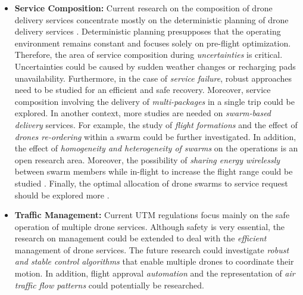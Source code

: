 \documentclass[conference]{IEEEtran}
\begin{document}
\begin{itemize}
    \item \textbf{Service Composition:}
   Current research on the composition of drone delivery services concentrate mostly on the deterministic planning of drone delivery services \cite{shahzaad2019composing}. Deterministic planning presupposes that the operating environment remains constant and focuses solely on pre-flight optimization. Therefore, the area of service composition during \textit{uncertainties} is critical. Uncertainties could be caused by sudden weather changes or recharging pads unavailability. Furthermore, in the case of \textit{service failure}, robust approaches need to be studied for an efficient and safe recovery. Moreover, service composition involving the delivery of\textit{ multi-packages} in a single trip could be explored. In another context, more studies are needed on \textit{swarm-based delivery} services. For example, the study of \textit{flight formations} and the effect of \textit{drones re-ordering} within a swarm could be further investigated. In addition, the effect of \textit{homogeneity and heterogeneity of swarms} on the operations is an open research area. Moreover, the possibility of \textit{sharing energy wirelessly} between swarm members while in-flight to increase the flight range could be studied \cite{lakhdari2020crowdsharing}. Finally, the optimal allocation of drone swarms to service request should be explored more \cite{alkouz2021reinforcemnt}. 
   


    
    \item \textbf{Traffic Management:}
    Current UTM regulations focus mainly on the safe operation of multiple drone services. Although safety is very essential, the research on management could be extended to deal with the \textit{efficient} management of drone services. The future research could investigate \textit{robust and stable control algorithms} that enable multiple drones to coordinate their motion. In addition, flight approval \textit{automation} and the representation of \textit{air traffic flow patterns} could potentially be researched. 


\end{itemize}
\end{document}
